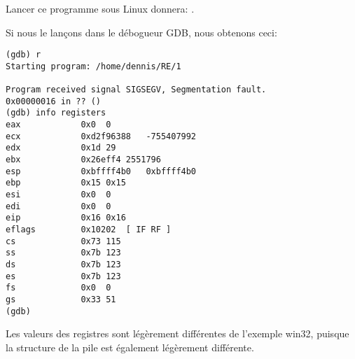 

Lancer ce programme sous Linux donnera: .


Si nous le lançons dans le débogueur GDB, nous obtenons ceci:

\begin{lstlisting}
(gdb) r
Starting program: /home/dennis/RE/1

Program received signal SIGSEGV, Segmentation fault.
0x00000016 in ?? ()
(gdb) info registers
eax            0x0	0
ecx            0xd2f96388	-755407992
edx            0x1d	29
ebx            0x26eff4	2551796
esp            0xbffff4b0	0xbffff4b0
ebp            0x15	0x15
esi            0x0	0
edi            0x0	0
eip            0x16	0x16
eflags         0x10202	[ IF RF ]
cs             0x73	115
ss             0x7b	123
ds             0x7b	123
es             0x7b	123
fs             0x0	0
gs             0x33	51
(gdb)
\end{lstlisting}

Les valeurs des registres sont légèrement différentes de l'exemple win32, puisque
la structure de la pile est également légèrement différente.
